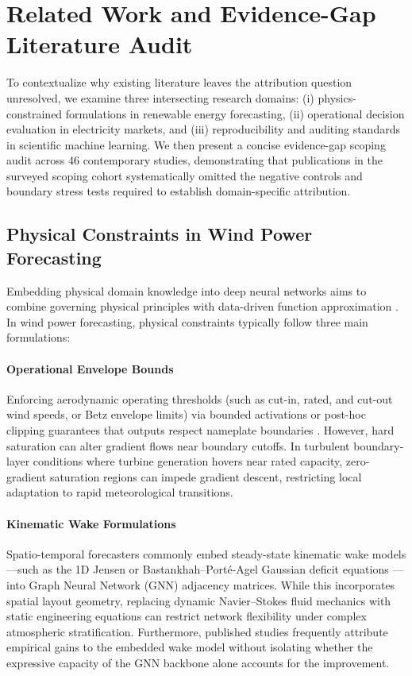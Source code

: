 \section{Related Work and Evidence-Gap Literature Audit}
\label{sec:related_work}

To contextualize why existing literature leaves the attribution question unresolved, we examine three intersecting research domains: (i) physics-constrained formulations in renewable energy forecasting, (ii) operational decision evaluation in electricity markets, and (iii) reproducibility and auditing standards in scientific machine learning. We then present a concise evidence-gap scoping audit across 46 contemporary studies, demonstrating that publications in the surveyed scoping cohort systematically omitted the negative controls and boundary stress tests required to establish domain-specific attribution.

\subsection{Physical Constraints in Wind Power Forecasting}
Embedding physical domain knowledge into deep neural networks aims to combine governing physical principles with data-driven function approximation \cite{karniadakis2021physics,raissi2019physics}. In wind power forecasting, physical constraints typically follow three main formulations:

\paragraph{Operational Envelope Bounds} Enforcing aerodynamic operating thresholds (such as cut-in, rated, and cut-out wind speeds, or Betz envelope limits) via bounded activations or post-hoc clipping guarantees that outputs respect nameplate boundaries \cite{tgdpf2025}. However, hard saturation can alter gradient flows near boundary cutoffs. In turbulent boundary-layer conditions where turbine generation hovers near rated capacity, zero-gradient saturation regions can impede gradient descent, restricting local adaptation to rapid meteorological transitions.

\paragraph{Kinematic Wake Formulations} Spatio-temporal forecasters commonly embed steady-state kinematic wake models---such as the 1D Jensen or Bastankhah--Port\'{e}-Agel Gaussian deficit equations \cite{jensen1983note,bastankhah2014new,s34_prx2023}---into Graph Neural Network (GNN) adjacency matrices. While this incorporates spatial layout geometry, replacing dynamic Navier--Stokes fluid mechanics with static engineering equations can restrict network flexibility under complex atmospheric stratification. Furthermore, published studies frequently attribute empirical gains to the embedded wake model without isolating whether the expressive capacity of the GNN backbone alone accounts for the improvement.

